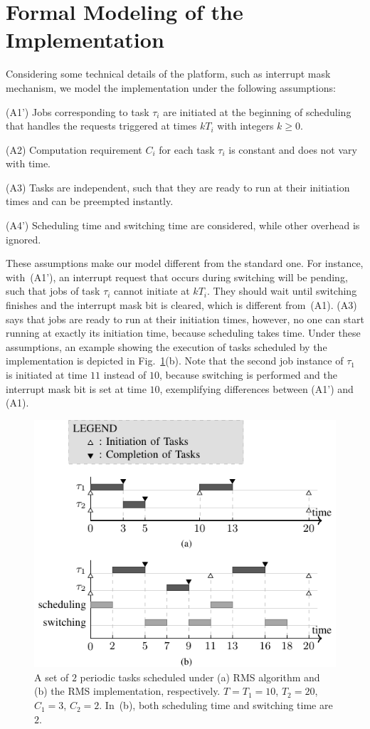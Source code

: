 \documentclass[journal]{IEEEtranTIE}
\begin{document}
\section{Formal Modeling of the Implementation}
\label{s:formalism}
Considering some technical details of the platform, such as interrupt
mask mechanism, we model the implementation under the following
assumptions:

(A1') Jobs corresponding to task $\tau_i$ are initiated at the
beginning of scheduling that handles the requests triggered at times
$kT_i$ with integers $k\ge 0$.

(A2) Computation requirement $C_i$ for each task $\tau_i$ is constant
and does not vary with time.

(A3) Tasks are independent, such that they are ready to run at their
initiation times and can be preempted instantly.

(A4') Scheduling time and switching time are considered, while other
overhead is ignored.

These assumptions make our model different from the standard one. For
instance, with~(A1'), an interrupt request that occurs during
switching will be pending, such that jobs of task $\tau_i$ cannot
initiate at $kT_i$. They should wait until switching finishes and the
interrupt mask bit is cleared, which is different from~(A1). (A3) says
that jobs are ready to run at their initiation times, however, no one
can start running at exactly its initiation time, because scheduling
takes time. Under these assumptions, an example showing the execution
of tasks scheduled by the implementation is depicted in
Fig.~\ref{f:example}(b). Note that the second job instance of $\tau_1$
is initiated at time $11$ instead of $10$, because switching is
performed and the interrupt mask bit is set at time $10$, exemplifying
differences between (A1') and (A1).

\begin{figure}[!t]
\centering
\includegraphics{FIG2_15-TIE-3480.pdf}
\caption{A set of $2$ periodic tasks scheduled under (a) RMS algorithm
  and (b) the RMS implementation, respectively. $T=T_1=10$, $T_2=20$,
  $C_1=3$, $C_2=2$. In~(b), both scheduling time and switching time
  are $2$.}
\label{f:example}
\end{figure}
\end{document}
